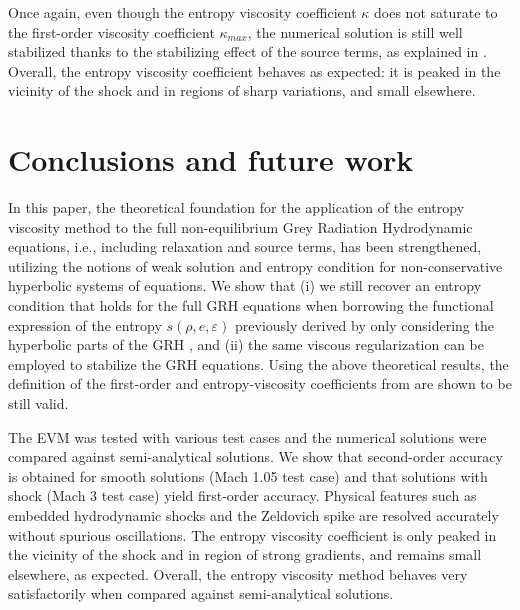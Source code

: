 \documentclass[times,doublespace]{fldauth}%
\begin{document}
Once again, even though the entropy viscosity coefficient $\kappa$ does not saturate to the first-order viscosity coefficient $\kappa_{max}$, the numerical solution is still well stabilized thanks to the stabilizing effect of the source terms, as explained in .
Overall, the entropy viscosity coefficient behaves as expected: it is peaked in the vicinity of the shock and in regions of sharp variations, and small elsewhere.
%
\section{Conclusions and future work}
In this paper, the theoretical foundation for the application of the entropy viscosity method to the full non-equilibrium Grey Radiation Hydrodynamic equations, i.e., including relaxation and source terms, has been strengthened, utilizing the notions of weak solution and entropy condition for non-conservative hyperbolic systems of equations. We show that 
(i) we still recover an entropy condition that holds for the full GRH equations when borrowing the functional expression of the entropy  $s(\rho,e,\varepsilon)$ previously derived by only considering the hyperbolic parts of the GRH \cite{our_jcp_radhy_paper}, and
(ii) the same viscous regularization can be employed to stabilize the GRH equations.
Using the above theoretical results, the definition of the first-order and entropy-viscosity coefficients from \cite{our_jcp_radhy_paper} are shown to be still valid. 

The EVM was tested with various test cases and the numerical solutions were compared against semi-analytical solutions. We show that second-order accuracy is obtained for smooth solutions  (Mach 1.05 test case) and that solutions with shock (Mach 3 test case) yield first-order accuracy. Physical features such as embedded hydrodynamic shocks and the Zeldovich spike are resolved accurately without spurious oscillations. The entropy viscosity coefficient is only peaked in the vicinity of the shock and in region of strong gradients, and remains small elsewhere, as expected. Overall, the entropy viscosity method behaves very satisfactorily when compared against semi-analytical solutions.
\end{document}
